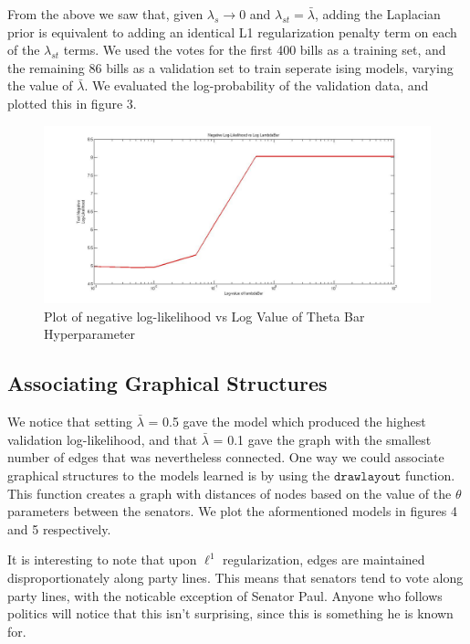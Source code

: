 \documentclass[]{article}
\begin{document}
From the above we saw that, given \(\lambda_s \rightarrow 0\) and
\(\lambda_{st} = \bar {\lambda }\), adding the Laplacian prior is
equivalent to adding an identical L1 regularization penalty term on each
of the \(\lambda_{st}\) terms. We used the votes for the first 400 bills
as a training set, and the remaining 86 bills as a validation set to
train seperate ising models, varying the value of \(\bar {\lambda }\).
We evaluated the log-probability of the validation data, and plotted
this in figure 3.

\begin{figure}
\begin{center}
\includegraphics[width=400pt]{fig3.jpg}
\caption{Plot of negative log-likelihood vs Log Value of Theta Bar Hyperparameter}
\end{center}
\end{figure}

\newpage

\subsection{Associating Graphical
Structures}\label{associating-graphical-structures}

We notice that setting \(\bar{\lambda}\) = 0.5 gave the model which
produced the highest validation log-likelihood, and that
\(\bar{\lambda}\) = 0.1 gave the graph with the smallest number of edges
that was nevertheless connected. One way we could associate graphical
structures to the models learned is by using the \(\texttt{drawlayout}\)
function. This function creates a graph with distances of nodes based on
the value of the \(\theta\) parameters between the senators. We plot the
aformentioned models in figures 4 and 5 respectively.

It is interesting to note that upon \(\ell^1\) regularization, edges are
maintained disproportionately along party lines. This means that
senators tend to vote along party lines, with the noticable exception of
Senator Paul. Anyone who follows politics will notice that this isn't
surprising, since this is something he is known for.
\end{document}
